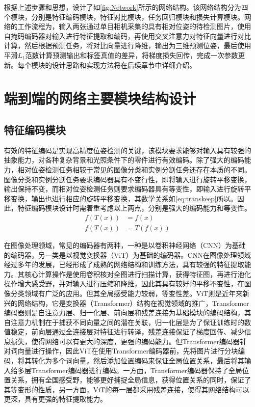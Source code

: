 \documentclass{Diploma}
\begin{document}
根据上述步骤和思想，设计了如\ref{fig:Network}所示的网络结构。该网络结构分为四个模块，分别是特征编码模块，特征对比模块，任务回归模块和损失计算模块。网络的工作流程为，输入两张通过单目相机采集的具有相对位姿的待检测图片，使用自掩码编码器对输入进行特征提取和编码，再使用交叉注意力对特征向量进行对比计算，然后根据预测任务，将对比向量进行降维，输出为三维预测位姿，最后使用平滑$L_{1}$范数计算预测输出和标签真值的差异，将梯度损失回传，完成一次参数更新。每个模块的设计思路和实现方法将在后续章节中详细介绍。
%

\section{端到端的网络主要模块结构设计}
\subsection{特征编码模块}
有效的特征编码是实现高精度位姿检测的关键，该模块要求能够对输入具有较强的抽象能力，对各种复杂背景和光照条件下的零件进行有效编码。除了强大的编码能力，相对位姿检测任务相较于常见的图像分类和实例分割任务还存在本质的不同。图像分类和实例分割任务要求编码器具有不变行性，即将输入进行旋转平移变换，输出保持不变，而相对位姿检测任务则要求编码器具有等变性，即输入进行旋转平移变换，输出也进行相应的旋转平移变换，其数学关系如\eqref{eq:transkeep}所以。因此，特征编码模块设计时需着重考虑以上两点，分别是强大的编码能力和等变性。
  \begin{equation} \label{eq:transkeep}
    \begin{aligned}
    f(T(x)) &= f(x) \\
    f(T(x)) &= T(f(x)) 
    \end{aligned}
  \end{equation}

  在图像处理领域，常见的编码器有两种，一种是以卷积神经网络（CNN）为基础的编码器，另一类是以视觉变换器（ViT）为基础的编码器。CNN在图像处理领域经过多年的发展，已经形成了成熟的网络结构和训练方法，具有较强的特征提取能力。其核心计算操作是使用卷积核对全图进行扫描计算，获得特征图，再进行池化操作增大感受野，并对输入进行压缩和降维，因此其具有较好的平移不变性，在图像分类领域有广泛的应用\cite{he2016deep}。但其全局感受能力较弱，等变性差。ViT则是近年来新兴的网络结构，它是变换器（Transformer）结构在视觉领域的推广\cite{dosovitskiy2020image}，Transformer编码器则是自注意力层、归一化层、前向层和残差连接为基础模块的编码结构，其自注意力机制在于捕获不同向量之间的潜在关联，归一化层是为了保证训练时的数值稳定，前向层通过全连接层对特征进行转译，残差连接保证了梯度回传、减少信息损失，使得网络可以有更大的深度，更强的编码能力\cite{vaswani2017attention}。但Transformer编码器针对词向量进行操作，因此ViT在使用Transformer编码器前，先将图片进行分块编码，将其转化为多个词向量，然后添加位置编码来保证全局位置关系，最后将其输入给多层Transformer编码器进行编码。一方面，Transformer编码器保持了全局位置关系，拥有全国感受野，能够更好捕捉全局信息，获得位置关系的同时，保证了其等变形的性质，另一方面，ViT的每一层都采用残差连接，使得其网络结构可以更深，具有更强的特征提取能力。
\end{document}
